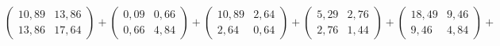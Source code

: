 \documentclass[a4paper,parskip=full-]{article}
\begin{document}
$$\begin{pmatrix} 10,89 & 13,86 \\ 13,86 & 17,64 \end{pmatrix} +
\begin{pmatrix} 0,09 & 0,66 \\ 0,66 & 4,84 \end{pmatrix} +
\begin{pmatrix} 10,89 & 2,64 \\ 2,64 & 0,64 \end{pmatrix} +
\begin{pmatrix} 5,29 & 2,76 \\ 2,76 & 1,44 \end{pmatrix} +

\begin{pmatrix} 18,49 & 9,46 \\ 9,46 & 4,84 \end{pmatrix} +
$$
\end{document}
